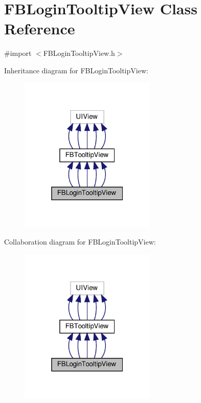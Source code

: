 \hypertarget{interfaceFBLoginTooltipView}{}\section{F\+B\+Login\+Tooltip\+View Class Reference}
\label{interfaceFBLoginTooltipView}


{\ttfamily \#import $<$F\+B\+Login\+Tooltip\+View.\+h$>$}



Inheritance diagram for F\+B\+Login\+Tooltip\+View\+:
\nopagebreak
\begin{figure}[H]
\begin{center}
\leavevmode
\includegraphics[width=184pt]{interfaceFBLoginTooltipView__inherit__graph}
\end{center}
\end{figure}


Collaboration diagram for F\+B\+Login\+Tooltip\+View\+:
\nopagebreak
\begin{figure}[H]
\begin{center}
\leavevmode
\includegraphics[width=184pt]{interfaceFBLoginTooltipView__coll__graph}
\end{center}
\end{figure}
